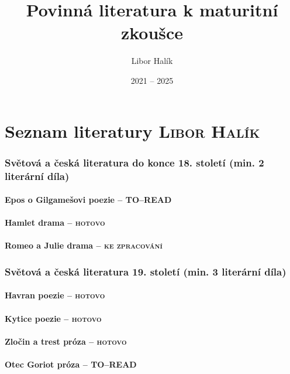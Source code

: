 \documentclass[A4paper]{extarticle} %
\author{Libor Halík}
\title{Povinná literatura k maturitní zkoušce}
\date{2021 -- 2025}
\begin{document}


\part*{Seznam literatury {\hfill \normalfont\tiny\textsc{Libor Halík}}}

\section*{Světová a česká literatura do konce 18. století {\tiny{(min. 2 literární díla)}}}

\subsection*{Epos o Gilgamešovi {\tiny{poezie  -- \textsc{TO--READ}}}}

\subsection*{Hamlet {\tiny{drama  -- \textsc{hotovo}}}}

\subsection*{Romeo a Julie {\tiny{drama  -- \textsc{ke zpracování}}}}

\section*{Světová a česká literatura 19. století {\tiny{(min. 3 literární díla)}}}

\subsection*{Havran {\tiny{poezie  -- \textsc{hotovo}}}}

\subsection*{Kytice {\tiny{poezie  -- \textsc{hotovo}}}}

\subsection*{Zločin a trest {\tiny{próza  -- \textsc{hotovo}}}}

\subsection*{Otec Goriot {\tiny{próza  -- \textsc{TO--READ}}}}
\end{document}
